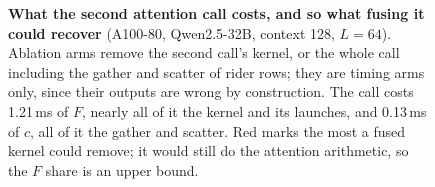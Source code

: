 \begin{figure}[t]
\caption{\textbf{What the second attention call costs, and so what fusing it
could recover} (A100-80, Qwen2.5-32B, context 128, $L{=}64$). Ablation arms
remove the second call's kernel, or the whole call including the gather and
scatter of rider rows; they are timing arms only, since their outputs are wrong
by construction. The call costs 1.21\,ms of $F$, nearly all of it the kernel and
its launches, and 0.13\,ms of $c$, all of it the gather and scatter. Red marks
the most a fused kernel could remove; it would still do the attention
arithmetic, so the $F$ share is an upper bound.}
\label{fig:abl-fusion}
\end{figure}
